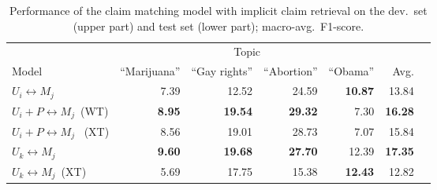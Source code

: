 \begin{table}
\begin{center}
{\small
\setlength{\tabcolsep}{4.8pt}
\begin{tabular}{lrrrrrr}
\toprule
&\multicolumn{4}{c}{Topic}\\
\cmidrule(lr){2-5}
Model & ``Marijuana'' & ``Gay rights''  & ``Abortion'' & ``Obama'' & Avg. \\
\midrule
$U_i \leftrightarrow M_j$ & 7.39          & 12.52        & 24.59       & {\bf 10.87} & 13.84 \\
$U_i + P \leftrightarrow M_j$\ (WT)     & {\bf 8.95}    & {\bf 19.54}  & {\bf 29.32} & 7.30        & {\bf 16.28} \\
$U_i + P \leftrightarrow M_j$ \ (XT)   & 8.56          & 19.01        & 28.73       & 7.07        & 15.84 \\
\midrule
$U_k \leftrightarrow M_j$            & {\bf 9.60}   & {\bf 19.68}   & {\bf 27.70} & 12.39       & {\bf 17.35} \\
$U_k \leftrightarrow M_j$\ (XT)  & 5.69         &  17.75        & 15.38       & {\bf 12.43} & 12.82 \\
\bottomrule
\end{tabular}}
\caption{Performance of the claim matching model with implicit claim retrieval on the
dev.~set (upper part) and test set (lower part); macro-avg.~F1-score.}
\label{tab:argpremise_retrieval}
\end{center}
\end{table}

% 

